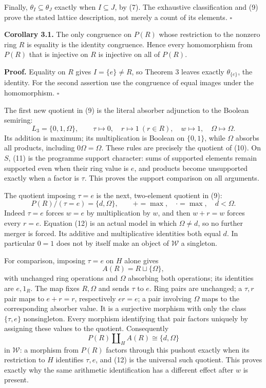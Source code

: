 \documentclass[
]{article}
\begin{document}
Finally, \(\theta_I\subseteq\theta_J\) exactly when \(I\subseteq J\), by
(7). The exhaustive classification and (9) prove the stated lattice
description, not merely a count of its elements. \(\square\)

\textbf{Corollary 3.1.} The only congruence on \(P(R)\) whose
restriction to the nonzero ring \(R\) is equality is the identity
congruence. Hence every homomorphism from \(P(R)\) that is injective on
\(R\) is injective on all of \(P(R)\).

\textbf{Proof.} Equality on \(R\) gives \(I=\{e\}\ne R\), so Theorem 3
leaves exactly \(\theta_{\{e\}}\), the identity. For the second
assertion use the congruence of equal images under the homomorphism.
\(\square\)

The first new quotient in (9) is the literal absorber adjunction to the
Boolean semiring: \[
L_3=\{0,1,\Omega\},\qquad
\tau\mapsto0,\quad r\mapsto1\ (r\in R),\quad w\mapsto1,\quad\Omega\mapsto\Omega.
\tag{11}
\] Its addition is maximum; its multiplication is Boolean on
\(\{0,1\}\), while \(\Omega\) absorbs all products, including
\(0\Omega=\Omega\). These rules are precisely the quotient of (10). On
\(S\), (11) is the programme support character: sums of supported
elements remain supported even when their ring value is \(e\), and
products become unsupported exactly when a factor is \(\tau\). This
proves the support comparison on all arguments.

The quotient imposing \(\tau=e\) is the next, two-element quotient in
(9): \[
P(R)/(\tau=e)=\{d,\Omega\},\qquad +=\max,\quad\cdot=\max,\quad d<\Omega.
\tag{12}
\] Indeed \(\tau=e\) forces \(w=e\) by multiplication by \(w\), and then
\(w+r=w\) forces every \(r=e\). Equation (12) is an actual model in
which \(\Omega\ne d\), so no further merger is forced. Its additive and
multiplicative identities both equal \(d\). In particular \(0=1\) does
not by itself make an object of \(\mathcal W\) a singleton.

For comparison, imposing \(\tau=e\) on \(H\) alone gives \[
A(R)=R\sqcup\{\Omega\},
\] with unchanged ring operations and \(\Omega\) absorbing both
operations; its identities are \(e,1_R\). The map fixes \(R,\Omega\) and
sends \(\tau\) to \(e\). Ring pairs are unchanged; a \(\tau,r\) pair
maps to \(e+r=r\), respectively \(er=e\); a pair involving \(\Omega\)
maps to the corresponding absorber value. It is a surjective morphism
with only the class \(\{\tau,e\}\) nonsingleton. Every morphism
identifying that pair factors uniquely by assigning these values to the
quotient. Consequently \[
P(R)\amalg_H A(R)\cong\{d,\Omega\}
\tag{13}
\] in \(\mathcal W\): a morphism from \(P(R)\) factors through this
pushout exactly when its restriction to \(H\) identifies \(\tau,e\), and
(12) is the universal such quotient. This proves exactly why the same
arithmetic identification has a different effect after \(w\) is present.
\end{document}
